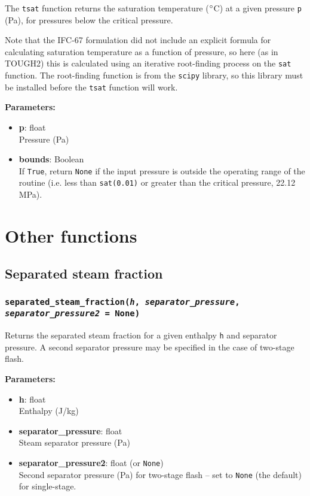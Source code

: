 The \texttt{tsat} function returns the saturation temperature ($\degree$C) at a given pressure \texttt{p} (Pa), for pressures below the critical pressure.

Note that the IFC-67 formulation did not include an explicit formula for calculating saturation temperature as a function of pressure, so here (as in TOUGH2) this is calculated using an iterative root-finding process on the \texttt{sat} function.  The root-finding function is from the \texttt{scipy} library, so this library must be installed before the \texttt{tsat} function will work.

\textbf{Parameters:}
\begin{itemize}
\item \textbf{p}: float\\
  Pressure (Pa)
\item \textbf{bounds}: Boolean\\
  If \texttt{True}, return \texttt{None} if the input pressure is outside the operating range of the routine (i.e. less than \texttt{sat(0.01)} or greater than the critical pressure, 22.12 MPa).
\end{itemize}

\section{Other functions}

\subsection{Separated steam fraction}

\begin{snugshade}
\subsubsection{\texttt{separated\_steam\_fraction(\emph{h}, \emph{separator\_pressure}, \emph{separator\_pressure2} = None)}}
\end{snugshade}
\label{sec:t2thermo:separated_steam_fraction}

Returns the separated steam fraction for a given enthalpy \texttt{h} and separator pressure.  A second separator pressure may be specified in the case of two-stage flash.

\textbf{Parameters:}
\begin{itemize}
\item \textbf{h}: float\\
  Enthalpy (J/kg)
\item \textbf{separator\_pressure}: float\\
  Steam separator pressure (Pa)
\item \textbf{separator\_pressure2}: float (or \texttt{None})\\
  Second separator pressure (Pa) for two-stage flash -- set to \texttt{None} (the default) for single-stage.
\end{itemize}

